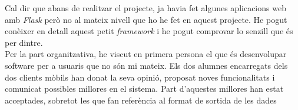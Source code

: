 Cal dir que abans de realitzar el projecte, ja havia fet algunes aplicacions web amb \emph{Flask} però no al mateix nivell que ho he fet en aquest projecte. He pogut conèixer en detall aquest petit \emph{framework} i he pogut comprovar lo senzill que és per dintre. \\


Per la part organitzativa, he viscut en primera persona el que és desenvolupar software per a usuaris que no són mi mateix. Els dos alumnes encarregats dels dos clients mòbils han donat la seva opinió, proposat noves funcionalitats i comunicat possibles millores en el sistema. Part d'aquestes millores han estat acceptades, sobretot les que fan referència al format de sortida de les dades

